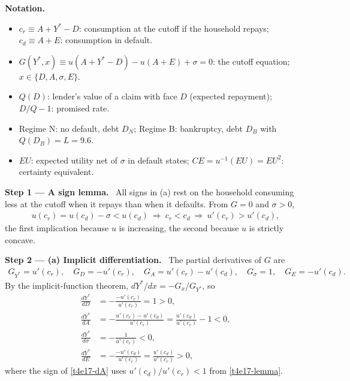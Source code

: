 \documentclass[11pt,a4paper]{article}
\newcommand{\notation}{\par\noindent\textbf{Notation.}}
\newcommand{\step}[2]{\par\medskip\noindent\textbf{Step #1 --- #2.}~}
\begin{document}
\notation
\begin{itemize}
  \item $c_r\equiv A+Y^*-D$: consumption at the cutoff if the household repays; $c_d\equiv A+E$: consumption in default.
  \item $G(Y^*,x)\equiv u(A+Y^*-D)-u(A+E)+\sigma=0$: the cutoff equation; $x\in\{D,A,\sigma,E\}$.
  \item $Q(D)$: lender's value of a claim with face $D$ (expected repayment); $D/Q-1$: promised rate.
  \item Regime N: no default, debt $D_N$; Regime B: bankruptcy, debt $D_B$ with $Q(D_B)=L=9.6$.
  \item $EU$: expected utility net of $\sigma$ in default states; $CE=u^{-1}(EU)=EU^2$: certainty equivalent.
\end{itemize}

\step{1}{A sign lemma} All signs in (a) rest on the household consuming less at the cutoff when it repays than
when it defaults. From $G=0$ and $\sigma>0$,
\begin{align}
  u(c_r) = u(c_d)-\sigma < u(c_d) \ \Longrightarrow\ c_r<c_d \ \Longrightarrow\ u'(c_r)>u'(c_d), \label{t4e17-lemma}
\end{align}
the first implication because $u$ is increasing, the second because $u$ is strictly concave.

\step{2}{(a) Implicit differentiation} The partial derivatives of $G$ are
\begin{align}
  G_{Y^*} = u'(c_r),\quad G_D = -u'(c_r),\quad G_A = u'(c_r)-u'(c_d),\quad G_\sigma = 1,\quad G_E=-u'(c_d). \label{t4e17-partials}
\end{align}
By the implicit-function theorem, $dY^*/dx=-G_x/G_{Y^*}$, so
\begin{align}
  \frac{dY^*}{dD} &= -\frac{-u'(c_r)}{u'(c_r)} = 1>0, \label{t4e17-dD}\\
  \frac{dY^*}{dA} &= -\frac{u'(c_r)-u'(c_d)}{u'(c_r)} = \frac{u'(c_d)}{u'(c_r)}-1<0, \label{t4e17-dA}\\
  \frac{dY^*}{d\sigma} &= -\frac{1}{u'(c_r)}<0, \label{t4e17-ds}\\
  \frac{dY^*}{dE} &= -\frac{-u'(c_d)}{u'(c_r)} = \frac{u'(c_d)}{u'(c_r)}>0, \label{t4e17-dE}
\end{align}
where the sign of \eqref{t4e17-dA} uses $u'(c_d)/u'(c_r)<1$ from \eqref{t4e17-lemma}.
\end{document}
